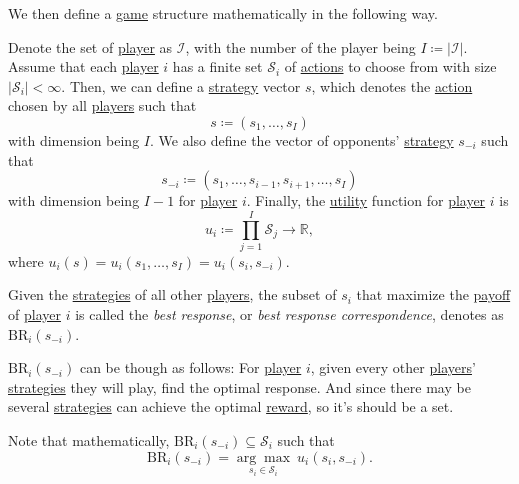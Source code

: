 We then define a \hyperref[def:game]{game} structure mathematically in the following way.
\begin{definition}\label{def:mathematical-game}
	Denote the set of \hyperref[def:player]{player} as \(\mathcal{I}\), with the number of the player being \(I\coloneqq \left\vert \mathcal{I} \right\vert \). Assume that each \hyperref[def:player]{player} \(i\) has a finite set \(\mathcal{S}_i\) of \hyperref[def:strategy]{actions} to choose from with size \(\left\vert \mathcal{S}_i \right\vert<\infty  \). Then, we can define a \hyperref[def:strategy]{strategy} vector \(s\), which denotes the \hyperref[def:strategy]{action} chosen by all \hyperref[def:player]{players} such that
	\[
		s\coloneqq (s_1, \ldots , s_I)
	\]
	with dimension being \(I\). We also define the vector of opponents' \hyperref[def:strategy]{strategy} \(s_{-i}\) such that
	\[
		s_{-i}\coloneqq (s_1,\ldots,s_{i - 1},s_{i + 1} ,\ldots,s_I)
	\]
	with dimension being \(I - 1\) for \hyperref[def:player]{player} \(i\). Finally, the \hyperref[def:reward]{utility} function for \hyperref[def:player]{player} \(i\) is
	\[
		u_{i} \coloneqq \prod\limits_{j = 1}^{I} \mathcal{S}_j \to \mathbb{R},
	\]
	where \(u_{i}(s) = u_{i}(s_1, \ldots , s_I) = u_{i}(s_{i}, s_{-i})\).
\end{definition}

\begin{definition}\label{def:best-response}
	Given the \hyperref[def:strategy]{strategies} of all other \hyperref[def:player]{players}, the subset of \(s_{i}\) that maximize the \hyperref[def:reward]{payoff} of \hyperref[def:player]{player} \(i\) is called the \emph{best response}, or \emph{best response correspondence}, denotes as \(\mathrm{BR}_i(s_{-i})\).
\end{definition}

\begin{intuition}
	\(\mathrm{BR}_i(s_{-i})\) can be though as follows: For \hyperref[def:player]{player} \(i\), given every other \hyperref[def:player]{players}' \hyperref[def:strategy]{strategies} they will play, find the optimal response. And since there may be several \hyperref[def:strategy]{strategies} can achieve the optimal \hyperref[def:reward]{reward}, so it's should be a set.
\end{intuition}

\begin{remark}
	Note that mathematically, \(\mathrm{BR}_i(s_{-i}) \subseteq \mathcal{S}_i\) such that
	\[
		\mathrm{BR}_i(s_{-i})= \underset{s_{i}\in\mathcal{S}_i}{\arg\max}\ u_{i}(s_{i}, s_{-i}).
	\]
\end{remark}